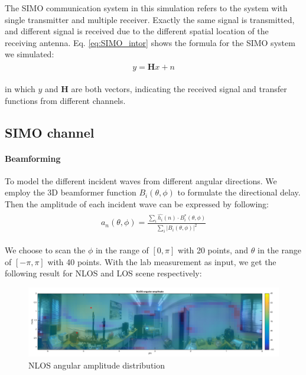 \documentclass[a4paper]{article}
\begin{document}
    \vspace*{+5mm}	
	
    The SIMO communication system in this simulation refers to the system with single transmitter and multiple receiver. Exactly the same signal is transmitted, and different signal is received due to the different spatial location of the receiving antenna. Eq. \ref{eq:SIMO_intor} shows the formula for the SIMO system we simulated:
     \begin{align} 
		\begin{split}
			y = \textbf{H}x + n
		\end{split}
		\label{eq:SIMO_intor}
	\end{align}
    
    in which $y$ and $\textbf{H}$ are both vectors, indicating the received signal and transfer functions from different channels.
    
	\subsection{SIMO channel}
    
    \paragraph{Beamforming} To model the different incident waves from different angular directions. We employ the 3D beamformer function $B_i(\theta, \phi)$ to formulate the directional delay. Then the amplitude of each incident wave can be expressed by following:
    \begin{align} 
		\begin{split}
			a_n(\theta, \phi) = \frac{\sum_i \hat{h_i}(n) \cdot B_i^*(\theta, \phi)}{\sum_i | B_i(\theta, \phi) |^2}
		\end{split}
		\label{eq:beamforming}
	\end{align}
    
    We choose to scan the $\phi$ in the range of $[0, \pi]$ with 20 points, and $\theta$ in the range of $[-\pi, \pi]$ with 40 points. With the lab measurement as input, we get the following result for NLOS and LOS scene respectively:
    
    \begin{figure}[h]
		\centering
		\includegraphics[scale=0.4]{figures/NLOS_angular.png}
		\vspace{-0.2cm}
		\centering
		\caption{NLOS angular amplitude distribution}
		\label{fig:angular_nlos}
	\end{figure}
    
\end{document}
